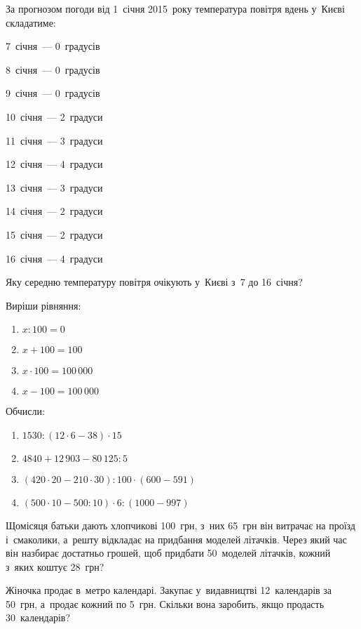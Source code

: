 \problem
За прогнозом погоди від 1~січня 2015~року температура повітря вдень
у~Києві складатиме:

\begin{multicols}{2}
  7~січня~--- 0~градусів

  8~січня~--- 0~градусів

  9~січня~--- 0~градусів

  10~січня~--- 2~градуси

  11~січня~--- 3~градуси

  12~січня~--- 4~градуси

  13~січня~--- 3~градуси

  14~січня~--- 2~градуси

  15~січня~--- 2~градуси

  16~січня~--- 4~градуси
\end{multicols}

Яку середню температуру повітря очікують у~Києві з~7 до 16~січня?


\problem
Виріши рівняння:
\begin{multicols}{2}
  \begin{enumerate}
    \item $x : 100 = 0$
    \item $x + 100 = 100$
    \item $x \cdot 100 = 100\,000$
    \item $x - 100 = 100\,000$
  \end{enumerate}
\end{multicols}


\problem
Обчисли:
\begin{enumerate}
  \item $1530 : (12 \cdot 6 - 38) \cdot 15$
  \item $4840 + 12\,903 - 80\,125 : 5$
  \item $(420 \cdot 20 - 210 \cdot 30) : 100 \cdot (600 - 591)$
  \item $(500 \cdot 10 - 500 : 10) \cdot 6 : (1000 - 997)$
\end{enumerate}


\problem
Щомісяця батьки дають хлопчикові 100~грн, з~них 65~грн він витрачає
на проїзд і~смаколики, а~решту відкладає на придбання моделей літачків.
Через який час він назбирає достатньо грошей, щоб придбати 50~моделей літачків,
кожний з~яких коштує 28~грн?


\problem
Жіночка продає в~метро календарі.
Закупає у~видавництві 12~календарів за 50~грн, а~продає кожний по 5~грн.
Скільки вона заробить, якщо продасть 30~календарів?


